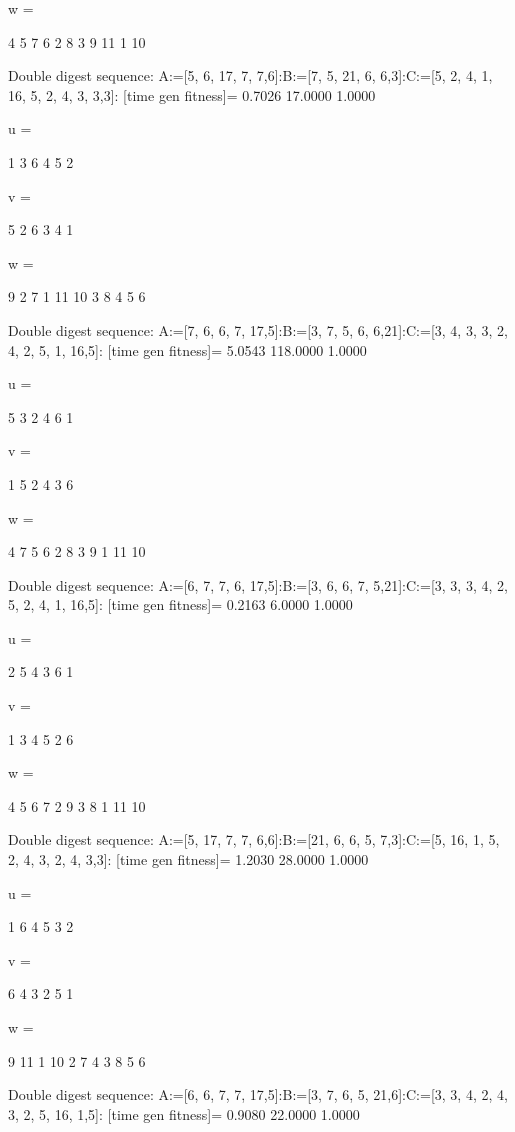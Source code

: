 w =

     4     5     7     6     2     8     3     9    11     1    10

Double digest sequence:
A:=[5, 6, 17, 7, 7,6]:B:=[7, 5, 21, 6, 6,3]:C:=[5, 2, 4, 1, 16, 5, 2, 4, 3, 3,3]:
[time gen fitness]=
    0.7026   17.0000    1.0000


u =

     1     3     6     4     5     2


v =

     5     2     6     3     4     1


w =

     9     2     7     1    11    10     3     8     4     5     6

Double digest sequence:
A:=[7, 6, 6, 7, 17,5]:B:=[3, 7, 5, 6, 6,21]:C:=[3, 4, 3, 3, 2, 4, 2, 5, 1, 16,5]:
[time gen fitness]=
    5.0543  118.0000    1.0000


u =

     5     3     2     4     6     1


v =

     1     5     2     4     3     6


w =

     4     7     5     6     2     8     3     9     1    11    10

Double digest sequence:
A:=[6, 7, 7, 6, 17,5]:B:=[3, 6, 6, 7, 5,21]:C:=[3, 3, 3, 4, 2, 5, 2, 4, 1, 16,5]:
[time gen fitness]=
    0.2163    6.0000    1.0000


u =

     2     5     4     3     6     1


v =

     1     3     4     5     2     6


w =

     4     5     6     7     2     9     3     8     1    11    10

Double digest sequence:
A:=[5, 17, 7, 7, 6,6]:B:=[21, 6, 6, 5, 7,3]:C:=[5, 16, 1, 5, 2, 4, 3, 2, 4, 3,3]:
[time gen fitness]=
    1.2030   28.0000    1.0000


u =

     1     6     4     5     3     2


v =

     6     4     3     2     5     1


w =

     9    11     1    10     2     7     4     3     8     5     6

Double digest sequence:
A:=[6, 6, 7, 7, 17,5]:B:=[3, 7, 6, 5, 21,6]:C:=[3, 3, 4, 2, 4, 3, 2, 5, 16, 1,5]:
[time gen fitness]=
    0.9080   22.0000    1.0000


